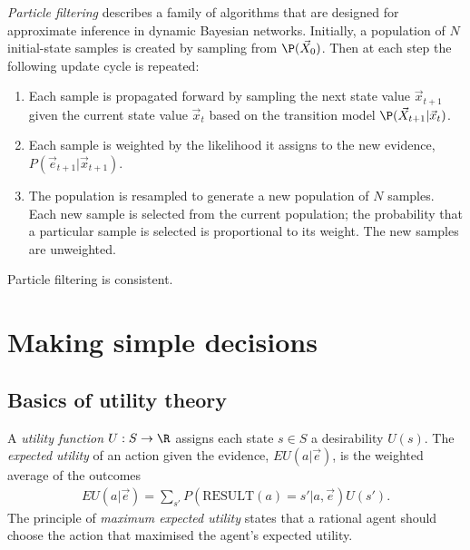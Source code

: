 \documentclass{article}
\begin{document}
\begin{definition}
    \emph{Particle filtering} describes a family of algorithms that are designed
    for approximate inference in dynamic Bayesian networks. Initially, a population of
    $N$ initial-state samples is created by sampling from $\P(\vec X_0)$. Then at each
    step the following update cycle is repeated:
    \begin{enumerate}
        \item Each sample is propagated forward by sampling the next state value $\vec x_{t+1}$
        given the current state value $\vec x_t$ based on the transition model $\P(\vec X_{t+1}|\vec x_t)$.
        \item Each sample is weighted by the likelihood it assigns to the new evidence, $P(\vec e_{t+1}|\vec x_{t+1})$.
        \item The population is resampled to generate a new population of $N$ samples. Each new sample is
        selected from the current population; the probability that a particular sample is selected is proportional
        to its weight. The new samples are unweighted.
    \end{enumerate}
\end{definition}

\begin{theorem}
    Particle filtering is consistent.
\end{theorem}

\section{Making simple decisions}

\subsection{Basics of utility theory}

\begin{definition}
    A \emph{utility function} $U:S\to\R$ assigns each state $s\in S$ a desirability
    $U(s)$. The \emph{expected utility} of an action given the evidence, $EU(a|\vec e)$,
    is the weighted average of the outcomes
    \begin{align*}
        EU(a|\vec e)=\sum_{s'} P(\text{RESULT}(a)=s'|a,\vec e)U(s').
    \end{align*}
    The principle of \emph{maximum expected utility} states that a rational agent
    should choose the action that maximised the agent's expected utility.
\end{definition}
\end{document}
